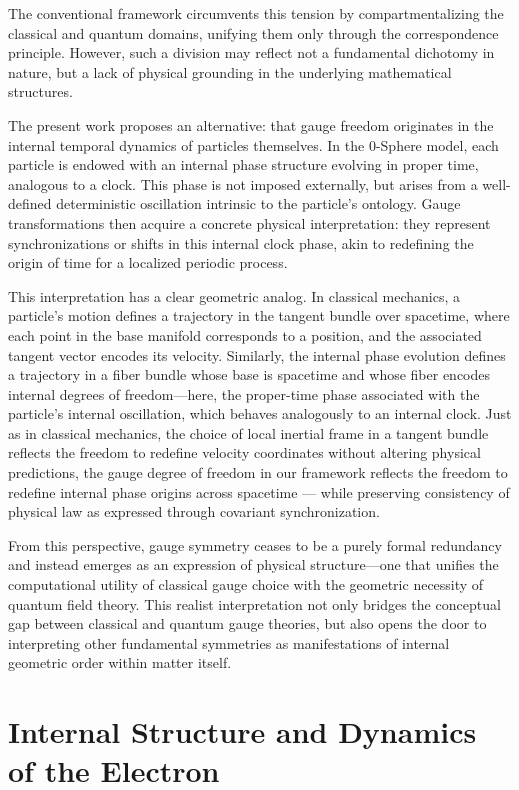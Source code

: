 \documentclass[%
 reprint,
 amsmath,amssymb,
 aps,
]{revtex4-1}
\numberwithin{equation}{section}%
\begin{document}
The conventional framework circumvents this tension by compartmentalizing the classical and quantum domains, unifying them only through the correspondence principle. However, such a division may reflect not a fundamental dichotomy in nature, but a lack of physical grounding in the underlying mathematical structures.

The present work proposes an alternative: that gauge freedom originates in the internal temporal dynamics of particles themselves. In the 0-Sphere model, each particle is endowed with an internal phase structure evolving in proper time, analogous to a clock. This phase is not imposed externally, but arises from a well-defined deterministic oscillation intrinsic to the particle’s ontology. Gauge transformations then acquire a concrete physical interpretation: they represent synchronizations or shifts in this internal clock phase, akin to redefining the origin of time for a localized periodic process.

This interpretation has a clear geometric analog. In classical mechanics, a particle’s motion defines a trajectory in the tangent bundle over spacetime, where each point in the base manifold corresponds to a position, and the associated tangent vector encodes its velocity. Similarly, the internal phase evolution defines a trajectory in a fiber bundle whose base is spacetime and whose fiber encodes internal degrees of freedom—here, the proper-time phase associated with the particle’s internal oscillation, which behaves analogously to an internal clock. Just as in classical mechanics, the choice of local inertial frame in a tangent bundle reflects the freedom to redefine velocity coordinates without altering physical predictions, the gauge degree of freedom in our framework reflects the freedom to redefine internal phase origins across spacetime --- while preserving consistency of physical law as expressed through covariant synchronization.

From this perspective, gauge symmetry ceases to be a purely formal redundancy and instead emerges as an expression of physical structure—one that unifies the computational utility of classical gauge choice with the geometric necessity of quantum field theory. This realist interpretation not only bridges the conceptual gap between classical and quantum gauge theories, but also opens the door to interpreting other fundamental symmetries as manifestations of internal geometric order within matter itself.


\section{Internal Structure and Dynamics of the Electron}
\end{document}

